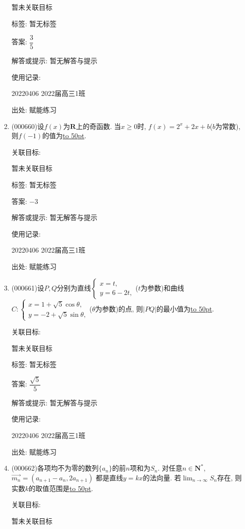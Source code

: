 \documentclass[10pt,a4paper]{article}
\newcommand{\blank}[1]{\underline{\hbox to #1pt{}}}
\begin{document}
\begin{enumerate}[1.]
暂未关联目标



标签: 暂无标签

答案: $\dfrac 35$

解答或提示: 暂无解答与提示

使用记录:

20220406	2022届高三1班	


出处: 赋能练习
\item { (000660)}设$f(x)$为$\mathbf{R}$上的奇函数. 当$x\ge 0$时, $f(x)=2^x+2x+b$($b$为常数), 则$f(-1)$的值为\blank{50}.


关联目标:

暂未关联目标



标签: 暂无标签

答案: $-3$

解答或提示: 暂无解答与提示

使用记录:

20220406	2022届高三1班	


出处: 赋能练习
\item { (000661)}设$P,Q$分别为直线$\begin{cases}  x=t, \\  y=6-2t, \end{cases}$($t$为参数)和曲线$C:\begin{cases} x=1+\sqrt5\cos\theta, \\ y=-2+\sqrt5\sin\theta,\end{cases}$($\theta$为参数)的点, 则$|PQ|$的最小值为\blank{50}.


关联目标:

暂未关联目标



标签: 暂无标签

答案: $\dfrac{\sqrt 5}5$

解答或提示: 暂无解答与提示

使用记录:

20220406	2022届高三1班	


出处: 赋能练习
\item { (000662)}各项均不为零的数列$\{a_n\}$的前$n$项和为$S_n$.  对任意$n\in \mathbf{N}^*$, $\overrightarrow{m_n}=(a_{n+1}-a_n,2a_{n+1})$
都是直线$y=kx$的法向量. 若$\displaystyle\lim_{n\to\infty}S_n$存在, 则实数$k$的取值范围是\blank{50}.


关联目标:

暂未关联目标




\end{enumerate}
\end{document}
